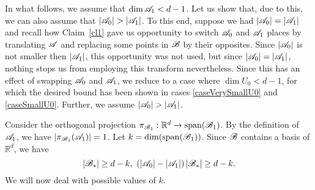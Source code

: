     In what follows, we assume that $\operatorname{dim}{\mathscr{A}}_1<d-1 $. Let us show that, due to this, we can also assume that $|\aaa_0|>|\aaa_1|$. To this end, suppose we had $|{\mathscr{A}}_0|=|{\mathscr{A}}_1|$ and recall how Claim~\ref{cl1} gave us opportunity to switch ${\mathscr{A}}_0$ and ${\mathscr{A}}_1$ places by translating ${\mathscr{A}}$ and replacing some points in ${\mathscr{B}}$ by their opposites. Since $|{\mathscr{A}}_0|$ is not smaller then $|{\mathscr{A}}_1|$, this opportunity was not used, but since $|{\mathscr{A}}_0|=|{\mathscr{A}}_1|$, nothing stops us from employing this transform nevertheless. Since this has an effect of swapping ${\mathscr{A}}_0$ and ${\mathscr{A}}_1$, we reduce to a case where $\operatorname{dim}U_0<d-1$, for which the desired bound has been shown in cases \ref{caseVerySmallU0} and \ref{caseSmallU0}. Further, we assume $|{\mathscr{A}}_0| > |{\mathscr{A}}_1|$.

        Consider the orthogonal projection $\pi_{{\mathscr{B}}_1}:\mathbb{R}^d\rightarrow\operatorname{span}({\mathscr{B}}_1)$. By the definition of ${\mathscr{A}}_1$, we have $\left|\pi_{{\mathscr{B}}_1}({\mathscr{A}}_1)\right|=1$. Let $k=\operatorname{dim(\operatorname{span}({\mathscr{B}}_1))}$. Since ${\mathscr{B}}$ contains a basis of $\mathbb{R}^d$, we have
        \begin{equation}\label{A_dif_B_star}
            \left|\bb_*\right|\geq d-k ,\ 
            \left(\left|\aaa_0\right|-\left|\aaa_1\right|\right)\left|\bb_*\right| \geq d-k.
        \end{equation}
        We will now deal with possible values of $k$.
